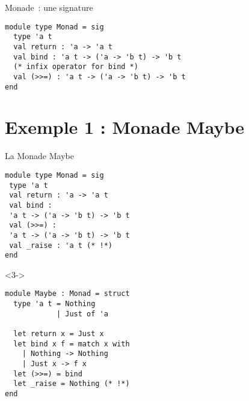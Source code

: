 \documentclass[10pt]{beamer}
\begin{document}
\begin{frame}[fragile]{Monade~: une signature}
  \begin{verbatim}
module type Monad = sig
  type 'a t
  val return : 'a -> 'a t
  val bind : 'a t -> ('a -> 'b t) -> 'b t
  (* infix operator for bind *)
  val (>>=) : 'a t -> ('a -> 'b t) -> 'b t
end
  \end{verbatim}
\end{frame}

\section{Exemple 1 : Monade Maybe}
\begin{frame}[fragile]{La Monade Maybe}
  \begin{minipage}[c]{0.45\linewidth}
    \begin{verbatim}
module type Monad = sig
 type 'a t
 val return : 'a -> 'a t
 val bind :
 'a t -> ('a -> 'b t) -> 'b t
 val (>>=) :
 'a t -> ('a -> 'b t) -> 'b t
 val _raise : 'a t (* !*)
end
    \end{verbatim}
  \end{minipage}
  \hfill
  \begin{minipage}[c]{0.45\linewidth}
  \begin{onlyenv}<3->
    \begin{verbatim}
module Maybe : Monad = struct
  type 'a t = Nothing
            | Just of 'a

  let return x = Just x
  let bind x f = match x with
    | Nothing -> Nothing
    | Just x -> f x
  let (>>=) = bind
  let _raise = Nothing (* !*)
end
    \end{verbatim}
    \end{onlyenv}
  \end{minipage}
\end{frame}
\end{document}
